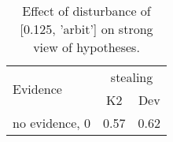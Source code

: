 \begin{table}\begin{tabular}{l|cc}\toprule\multirow{2}{*}{Evidence} & \multicolumn{2}{c}{stealing}\\& {K2} & {Dev}\\\midrule
no evidence, 0 & \cellcolor{Bittersweet}0.57&\cellcolor{Bittersweet}0.62\\\bottomrule\end{tabular}\caption{Effect of disturbance of [0.125, 'arbit'] on strong view of hypotheses.}\end{table}